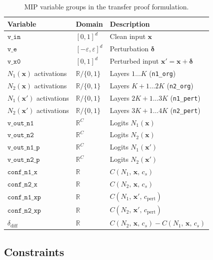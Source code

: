 \documentclass[11pt,a4paper]{article}
\theoremstyle{definition}
\theoremstyle{plain}
\newcommand{\Conf}[3]{C(#1,\,#2,\,#3)}
\newcommand{\NN}[1]{N_{#1}}
\newcommand{\vx}{\mathbf{x}}
\newcommand{\ve}{\boldsymbol{\delta}}
\newcommand{\vxp}{\mathbf{x}'}
\newcommand{\eps}{\varepsilon}
\newcommand{\deltadiff}{\delta_{\mathrm{diff}}}
\begin{document}
\begin{table}[h]
\centering
\caption{MIP variable groups in the transfer proof formulation.}
\label{tab:variables}
\begin{tabular}{lll}
\toprule
\textbf{Variable} & \textbf{Domain} & \textbf{Description} \\
\midrule
$\mathtt{v\_in}$ & $[0,1]^d$ & Clean input $\vx$ \\
$\mathtt{v\_e}$ & $[-\eps,\eps]^d$ & Perturbation $\ve$ \\
$\mathtt{v\_x0}$ & $[0,1]^d$ & Perturbed input $\vxp = \vx+\ve$ \\
\midrule
$\NN{1}(\vx)$ activations & $\mathbb{R}/\{0,1\}$ & Layers $1\ldots K$ \;(\texttt{n1\_org}) \\
$\NN{2}(\vx)$ activations & $\mathbb{R}/\{0,1\}$ & Layers $K+1\ldots 2K$ \;(\texttt{n2\_org}) \\
$\NN{1}(\vxp)$ activations & $\mathbb{R}/\{0,1\}$ & Layers $2K+1\ldots 3K$ \;(\texttt{n1\_pert}) \\
$\NN{2}(\vxp)$ activations & $\mathbb{R}/\{0,1\}$ & Layers $3K+1\ldots 4K$ \;(\texttt{n2\_pert}) \\
\midrule
$\mathtt{v\_out\_n1}$ & $\mathbb{R}^C$ & Logits $\NN{1}(\vx)$ \\
$\mathtt{v\_out\_n2}$ & $\mathbb{R}^C$ & Logits $\NN{2}(\vx)$ \\
$\mathtt{v\_out\_n1\_p}$ & $\mathbb{R}^C$ & Logits $\NN{1}(\vxp)$ \\
$\mathtt{v\_out\_n2\_p}$ & $\mathbb{R}^C$ & Logits $\NN{2}(\vxp)$ \\
\midrule
$\mathtt{conf\_n1\_x}$ & $\mathbb{R}$ & $\Conf{\NN{1}}{\vx}{c_s}$ \\
$\mathtt{conf\_n2\_x}$ & $\mathbb{R}$ & $\Conf{\NN{2}}{\vx}{c_s}$ \\
$\mathtt{conf\_n1\_xp}$ & $\mathbb{R}$ & $\Conf{\NN{1}}{\vxp}{c_{\mathrm{pert}}}$ \\
$\mathtt{conf\_n2\_xp}$ & $\mathbb{R}$ & $\Conf{\NN{2}}{\vxp}{c_{\mathrm{pert}}}$ \\
$\deltadiff$ & $\mathbb{R}$ & $\Conf{\NN{2}}{\vx}{c_s}-\Conf{\NN{1}}{\vx}{c_s}$ \\
\bottomrule
\end{tabular}
\end{table}

\subsection{Constraints}
\end{document}
